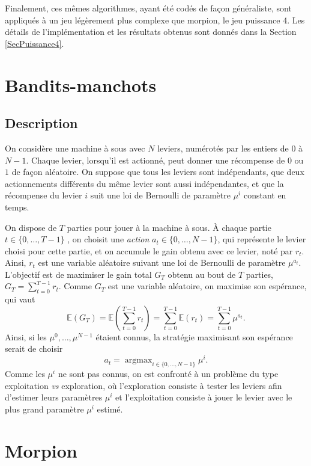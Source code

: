 \documentclass[a4paper,12pt]{article}
\DeclareMathOperator*{\argmax}{argmax}
\begin{document}
Finalement, ces mêmes algorithmes, ayant été codés de façon généraliste, sont appliqués à un jeu légèrement plus complexe que morpion, le jeu puissance 4. Les détails de l'implémentation et les résultats obtenus sont donnés dans la Section \ref{SecPuissance4}.

\section{Bandits-manchots}
\label{SecBM}

\subsection{Description}

On considère une machine à sous avec $N$ leviers, numérotés par les entiers de $0$ à $N-1$. Chaque levier, lorsqu'il est actionné, peut donner une récompense de $0$ ou $1$ de façon aléatoire. On suppose que tous les leviers sont indépendants, que deux actionnements différents du même levier sont aussi indépendantes, et que la récompense du levier $i$ suit une loi de Bernoulli de paramètre $\mu^i$ constant en temps.

On dispose de $T$ parties pour jouer à la machine à sous. À chaque partie $t \in \{0, \dotsc, T-1\}$ , on choisit une \emph{action} $a_t \in \{0, \dotsc, N-1\}$, qui représente le levier choisi pour cette partie, et on accumule le gain obtenu avec ce levier, noté par $r_t$. Ainsi, $r_t$ est une variable aléatoire suivant une loi de Bernoulli de paramètre $\mu^{a_t}$. L'objectif est de maximiser le gain total $G_T$ obtenu au bout de $T$ parties, $G_T = \sum_{t=0}^{T-1} r_t$. Comme $G_T$ est une variable aléatoire, on maximise son espérance, qui vaut
\[
\mathbb E(G_T) = \mathbb E\left(\sum_{t=0}^{T-1} r_t\right) = \sum_{t=0}^{T-1} \mathbb E(r_t) = \sum_{t=0}^{T-1} \mu^{a_t}.
\]
Ainsi, si les $\mu^0, \dotsc, \mu^{N-1}$ étaient connus, la stratégie maximisant son espérance serait de choisir
\[a_t = \argmax_{i \in \{0, \dotsc, N-1\}} \mu^i.\]
Comme les $\mu^i$ ne sont pas connus, on est confronté à un problème du type exploitation \emph{vs} exploration, où l'exploration consiste à tester les leviers afin d'estimer leurs paramètres $\mu^i$ et l'exploitation consiste à jouer le levier avec le plus grand paramètre $\mu^i$ estimé.

\section{Morpion}
\label{SecMorpion}
\end{document}
